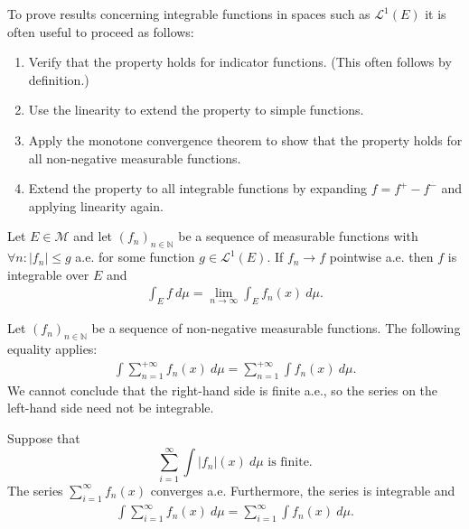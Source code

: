     \begin{method}\label{lebesgue:method:linear_proofs}
        To prove results concerning integrable functions in spaces such as $\mathcal{L}^1(E)$ it is often useful to proceed as follows:
        \begin{enumerate}
            \item Verify that the property holds for indicator functions. (This often follows by definition.)
            \item Use the linearity to extend the property to simple functions.
            \item Apply the monotone convergence theorem to show that the property holds for all non-negative measurable functions.
            \item Extend the property to all integrable functions by expanding $f = f^+ - f^-$ and applying linearity again.
        \end{enumerate}
    \end{method}

    \begin{theorem}\label{lebesgue:theorem:dominated_convergence_theorem}
        Let $E\in\mathcal{M}$ and let $(f_n)_{n\in\mathbb{N}}$ be a sequence of measurable functions with $\forall n:|f_n|\leq g$ a.e. for some function $g\in\mathcal{L}^1(E)$. If $f_n\rightarrow f$ pointwise a.e. then $f$ is integrable over $E$ and
        \begin{gather}
            \int_E f\ d\mu = \lim_{n\rightarrow\infty}\int_E f_n(x)\ d\mu.
        \end{gather}
    \end{theorem}

    \begin{property}
        Let $(f_n)_{n\in\mathbb{N}}$ be a sequence of non-negative measurable functions. The following equality applies:
        \begin{gather}
            \int\sum_{n=1}^{+\infty}f_n(x)\ d\mu = \sum_{n=1}^{+\infty}\int f_n(x)\ d\mu.
        \end{gather}
        We cannot conclude that the right-hand side is finite a.e., so the series on the left-hand side need not be integrable.
    \end{property}

    \begin{theorem}\label{lebesgue:theorem:beppo_levi}
        Suppose that \[\sum_{i=1}^\infty\int|f_n|(x)\ d\mu\text{ is finite.}\] The series $\sum_{i=1}^\infty f_n(x)$ converges a.e. Furthermore, the series is integrable and
        \begin{gather}
            \int\sum_{i=1}^\infty f_n(x)\ d\mu = \sum_{i=1}^\infty\int f_n(x)\ d\mu.
        \end{gather}
    \end{theorem}

